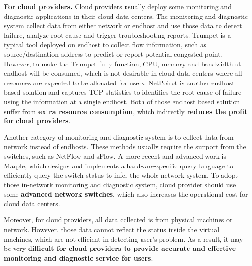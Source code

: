 \documentclass{article}
\begin{document}
\textbf{For cloud providers.} Cloud providers usually deploy some monitoring and diagnostic applications in their cloud data centers. The monitoring and diagnostic system collect data from either network or endhost and use those data to detect failure, analyze root cause and trigger troubleshooting reports. Trumpet\cite{sigcomm/trumpet} is a typical tool deployed on endhost to collect flow information, such as source/destination address to predict or report potential congested point. However, to make the Trumpet fully function, CPU, memory and bandwidth at endhost will be consumed, which is not desirable in cloud data centers where all resources are expected to be allocated for users. NetPoirot\cite{sigcomm/netpoirot} is another endhost based solution and captures TCP statistics to identifies the root cause of failure using the information at a single endhost. Both of those endhost based solution suffer from \textbf{extra resource consumption}, which indirectly \textbf{reduces the profit for cloud providers}.

Another category of monitoring and diagnostic system is to collect data from network instead of endhosts. These methods usually require the support from the switches, such as NetFlow\cite{url/netflow} and sFlow\cite{url/sflow}. A more recent and advanced work is Marple\cite{sigcomm/marple}, which designs and implements a hardware-specific query language to efficiently query the switch status to infer the whole network system. To adopt those in-network monitoring and diagnostic system, cloud provider should use some \textbf{advanced network switches}, which also increases the operational cost for cloud data centers.

Moreover, for cloud providers, all data collected is from physical machines or network. However, those data cannot reflect the status inside the virtual machines, which are not efficient in detecting user's problem. As a result, it may be very \textbf{difficult for cloud providers to provide accurate and effective monitoring and diagnostic service for users}.
\end{document}
